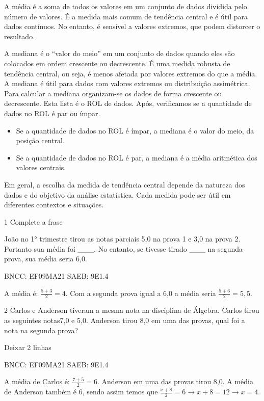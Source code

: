 \begin{escolha}
{{{\begin{escolha}
{{{{{\begin{escolha}
\begin{escolha}
{\begin{q°}
{A média é a soma de todos os valores em um conjunto de dados dividida
pelo número de valores. É a medida mais comum de tendência central e é
útil para dados contínuos. No entanto, é sensível a valores extremos,
que podem distorcer o resultado.

A mediana é o ``valor do meio'' em um conjunto de dados quando eles são
colocados em ordem crescente ou decrescente. É uma medida robusta de
tendência central, ou seja, é menos afetada por valores extremos do que
a média. A mediana é útil para dados com valores extremos ou
distribuição assimétrica. Para calcular a mediana organizam-se os dados
de forma crescente ou decrescente. Esta lista é o ROL de dados. Após,
verificamos se a quantidade de dados no ROL é par ou ímpar.

\begin{itemize}
\item
  Se a quantidade de dados no ROL é ímpar, a mediana é o valor do meio,
  da posição central.
\item
  Se a quantidade de dados no ROL é par, a mediana é a média aritmética
  dos valores centrais.
\end{itemize}

Em geral, a escolha da medida de tendência central depende da natureza
dos dados e do objetivo da análise estatística. Cada medida pode ser
útil em diferentes contextos e situações.
}


\num{1} Complete a frase

João no 1° trimestre tirou as notas parciais 5,0 na prova 1 e 3,0 na
prova 2. Portanto sua média foi \_\_\_. No entanto, se tivesse tirado
\_\_\_ na segunda prova, sua média seria 6,0.

BNCC: EF09MA21 SAEB: 9E1.4

A média é: \(\frac{5 + 3}{2} = 4\). Com a segunda prova igual a 6,0 a
média seria \(\frac{5 + 6}{2} = 5,5\).

\num{2} Carlos e Anderson tiveram a mesma nota na disciplina de Álgebra.
Carlos tirou as seguintes notas7,0 e 5,0. Anderson tirou 8,0 em uma das
provas, qual foi a nota na segunda prova?

Deixar 2 linhas

BNCC: EF09MA21 SAEB: 9E1.4

A média de Carlos é: \(\frac{7 + 5}{2} = 6\). Anderson em uma das provas
tirou 8,0. A média de Anderson também é 6, sendo assim temos que
\(\frac{x + 8}{2} = 6 \rightarrow x + 8 = 12 \rightarrow x = 4\).


\end{q°}}
\end{escolha}
\end{escolha}}}}}}
\end{escolha}}}}
\end{escolha}

